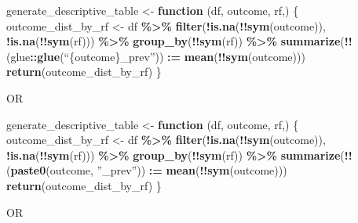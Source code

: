 \documentclass[
]{book}
\newenvironment{Shaded}{\begin{snugshade}}{\end{snugshade}}
\newcommand{\ControlFlowTok}[1]{\textcolor[rgb]{0.13,0.29,0.53}{\textbf{#1}}}
\newcommand{\FunctionTok}[1]{\textcolor[rgb]{0.13,0.29,0.53}{\textbf{#1}}}
\newcommand{\NormalTok}[1]{#1}
\newcommand{\OtherTok}[1]{\textcolor[rgb]{0.56,0.35,0.01}{#1}}
\newcommand{\SpecialCharTok}[1]{\textcolor[rgb]{0.81,0.36,0.00}{\textbf{#1}}}
\begin{document}
\begin{Shaded}
\begin{Highlighting}[]
\NormalTok{generate\_descriptive\_table }\OtherTok{\textless{}{-}} \ControlFlowTok{function}\NormalTok{ (df, outcome, rf,) \{}
\NormalTok{  outcome\_dist\_by\_rf }\OtherTok{\textless{}{-}}\NormalTok{ df }\SpecialCharTok{\%\textgreater{}\%} 
  \FunctionTok{filter}\NormalTok{(}\SpecialCharTok{!}\FunctionTok{is.na}\NormalTok{(}\SpecialCharTok{!!}\FunctionTok{sym}\NormalTok{(outcome)), }\SpecialCharTok{!}\FunctionTok{is.na}\NormalTok{(}\SpecialCharTok{!!}\FunctionTok{sym}\NormalTok{(rf))) }\SpecialCharTok{\%\textgreater{}\%} 
  \FunctionTok{group\_by}\NormalTok{(}\SpecialCharTok{!!}\FunctionTok{sym}\NormalTok{(rf)) }\SpecialCharTok{\%\textgreater{}\%}
  \FunctionTok{summarize}\NormalTok{(}\SpecialCharTok{!!}\NormalTok{(glue}\SpecialCharTok{::}\FunctionTok{glue}\NormalTok{(“\{outcome\}\_prev”)) }\SpecialCharTok{:=} \FunctionTok{mean}\NormalTok{(}\SpecialCharTok{!!}\FunctionTok{sym}\NormalTok{(outcome))) }
  \FunctionTok{return}\NormalTok{(outcome\_dist\_by\_rf)}
\NormalTok{\}}
\end{Highlighting}
\end{Shaded}

OR

\begin{Shaded}
\begin{Highlighting}[]
\NormalTok{generate\_descriptive\_table }\OtherTok{\textless{}{-}} \ControlFlowTok{function}\NormalTok{ (df, outcome, rf,) \{}
\NormalTok{  outcome\_dist\_by\_rf }\OtherTok{\textless{}{-}}\NormalTok{ df }\SpecialCharTok{\%\textgreater{}\%} 
  \FunctionTok{filter}\NormalTok{(}\SpecialCharTok{!}\FunctionTok{is.na}\NormalTok{(}\SpecialCharTok{!!}\FunctionTok{sym}\NormalTok{(outcome)), }\SpecialCharTok{!}\FunctionTok{is.na}\NormalTok{(}\SpecialCharTok{!!}\FunctionTok{sym}\NormalTok{(rf))) }\SpecialCharTok{\%\textgreater{}\%} 
  \FunctionTok{group\_by}\NormalTok{(}\SpecialCharTok{!!}\FunctionTok{sym}\NormalTok{(rf)) }\SpecialCharTok{\%\textgreater{}\%}
  \FunctionTok{summarize}\NormalTok{(}\SpecialCharTok{!!}\NormalTok{(}\FunctionTok{paste0}\NormalTok{(outcome, ”\_prev”)) }\SpecialCharTok{:=} \FunctionTok{mean}\NormalTok{(}\SpecialCharTok{!!}\FunctionTok{sym}\NormalTok{(outcome)))}
  \FunctionTok{return}\NormalTok{(outcome\_dist\_by\_rf)}
\NormalTok{\}}
\end{Highlighting}
\end{Shaded}

OR
\end{document}

